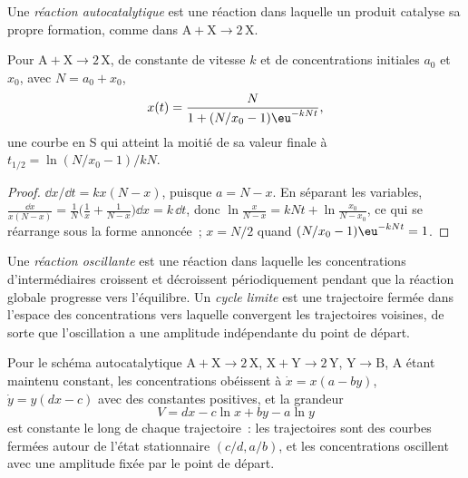 \begin{definition}\label{def:b3:complex-kinetics:autocatalysis}
Une \emph{réaction autocatalytique} est une
réaction dans laquelle un produit catalyse sa propre formation, comme
dans $\mathrm{A + X \to 2\,X}$.
\end{definition}

\begin{proposition}\label{prop:b3:complex-kinetics:logistic}
Pour $\mathrm{A + X \to 2\,X}$, de constante de vitesse $k$ et de
concentrations initiales $a_0$ et $x_0$,
avec $N = a_0 + x_0$,
\[
  x(t) = \frac{N}{1 + (N/x_0 - 1)\eu^{-kNt}},
\]
une courbe en S qui atteint la moitié de sa valeur finale à $t_{1/2} = \ln(N/x_0 - 1)/kN$.
\end{proposition}

\begin{proof}
$\dd x/\dd t = kx(N - x)$, puisque $a = N - x$. En séparant les
variables, $\frac{\dd x}{x(N - x)} = \frac1N\bigl(\frac1x + \frac{1}{N - x}\bigr)\dd x
= k\,\dd t$, donc $\ln\frac{x}{N - x} = kNt + \ln\frac{x_0}{N - x_0}$,
ce qui se réarrange sous la forme annoncée~;
$x = N/2$ quand $(N/x_0 - 1)\eu^{-kNt} = 1$.
\end{proof}

\begin{definition}\label{def:b3:complex-kinetics:oscillating}
Une \emph{réaction oscillante} est une réaction dans
laquelle les concentrations d'intermédiaires croissent et décroissent
périodiquement pendant que la réaction globale progresse vers
l'équilibre. Un \emph{cycle limite} est une
trajectoire fermée dans l'espace des concentrations vers laquelle
convergent les trajectoires voisines, de sorte que l'oscillation a une
amplitude indépendante du point de départ.
\end{definition}

\begin{theorem}\label{thm:b3:complex-kinetics:lotka-volterra}
Pour le schéma autocatalytique $\mathrm{A + X \to 2\,X}$, $\mathrm{X + Y \to 2\,Y}$, $\mathrm{Y \to B}$,
A étant maintenu
constant, les concentrations obéissent à $\dot x = x(a - by)$, $\dot y = y(dx - c)$ avec des
constantes positives, et la grandeur
\[
  V = dx - c\ln x + by - a\ln y
\]
est constante le long de chaque trajectoire~: les trajectoires sont des
courbes fermées autour de l'état stationnaire $(c/d, a/b)$, et les
concentrations oscillent avec une amplitude fixée par le point de
départ.
\end{theorem}

